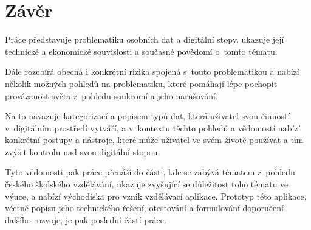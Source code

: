 \chapter*{Závěr}

Práce představuje problematiku osobních dat a digitální stopy, ukazuje její technické a ekonomické souvislosti a současné povědomí o~tomto tématu.

Dále rozebírá obecná i konkrétní rizika spojená s~touto problematikou a nabízí několik možných pohledů na problematiku, které pomáhají lépe pochopit provázanost světa z~pohledu soukromí a jeho narušování.

Na to navazuje kategorizací a popisem typů dat, která uživatel svou činností v~digitálním prostředí vytváří, a v~kontextu těchto pohledů a vědomostí nabízí konkrétní postupy a nástroje, které může uživatel ve svém životě používat a tím zvýšit kontrolu nad svou digitální stopou.

Tyto vědomosti pak práce přenáší do části, kde se zabývá tématem z~pohledu českého školského vzdělávání, ukazuje zvyšující se důležitost toho tématu ve výuce, a nabízí východiska pro vznik vzdělávací aplikace.
Prototyp této aplikace, včetně popisu jeho technického řešení, otestování a formulování doporučení dalšího rozvoje, je pak poslední částí práce.
